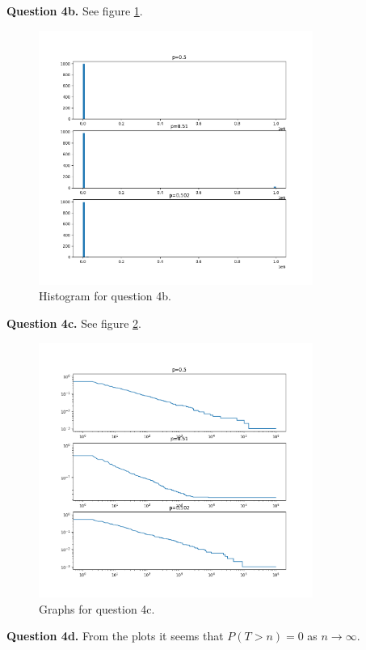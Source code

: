 \documentclass[letterpaper, reqno,11pt]{article}
\begin{document}
{\medskip\noindent\bf Question 4b.} See figure \ref{fig:4b}. 

\begin{figure}[htpb]
    \centering
    \includegraphics[width=0.8\textwidth]{4b}
    \caption{Histogram for question 4b.}
    \label{fig:4b}
\end{figure}

{\medskip\noindent\bf Question 4c.} See figure \ref{fig:4c}.

\begin{figure}[htpb]
    \centering
    \includegraphics[width=0.8\textwidth]{4c}
    \caption{Graphs for question 4c.}
    \label{fig:4c}
\end{figure}

{\medskip\noindent\bf Question 4d.} From the plots it seems that $P(T>n)=0$ as $n\to \infty$. 
\end{document}
